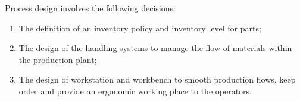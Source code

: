 Process design involves the following decisions:
\begin{enumerate}
    \item The definition of an inventory policy and inventory level for parts;
    \item The design of the handling systems to manage the flow of materials within the production plant;
    \item The design of workstation and workbench to smooth production flows, keep order and provide an ergonomic working place to the operators.
\end{enumerate}

